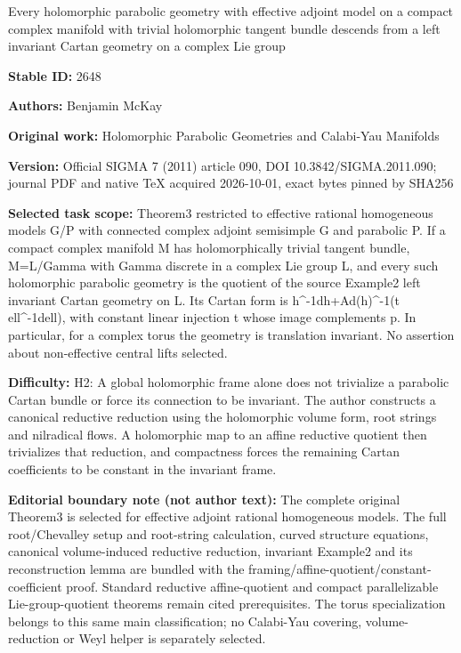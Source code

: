 \documentclass[11pt]{article}
\begin{document}
\begin{center}\Large Every holomorphic parabolic geometry with effective adjoint model on a compact complex manifold with trivial holomorphic tangent bundle descends from a left invariant Cartan geometry on a complex Lie group\end{center}
\noindent\textbf{Stable ID:} 2648\par
\noindent\textbf{Authors:} Benjamin McKay\par
\noindent\textbf{Original work:} Holomorphic Parabolic Geometries and Calabi-Yau Manifolds\par
\noindent\textbf{Version:} Official SIGMA 7 (2011) article 090, DOI 10.3842/SIGMA.2011.090; journal PDF and native TeX acquired 2026-10-01, exact bytes pinned by SHA256\par
\noindent\textbf{Selected task scope:} Theorem3 restricted to effective rational homogeneous models G/P with connected complex adjoint semisimple G and parabolic P. If a compact complex manifold M has holomorphically trivial tangent bundle, M=\allowbreak{}L/Gamma with Gamma discrete in a complex Lie group L, and every such holomorphic parabolic geometry is the quotient of the source Example2 left invariant Cartan geometry on L. Its Cartan form is h\textasciicircum{}-1dh+\allowbreak{}Ad(h)\textasciicircum{}-1(t ell\textasciicircum{}-1dell), with constant linear injection t whose image complements p. In particular, for a complex torus the geometry is translation invariant. No assertion about non-effective central lifts selected.\par
\noindent\textbf{Difficulty:} H2: A global holomorphic frame alone does not trivialize a parabolic Cartan bundle or force its connection to be invariant. The author constructs a canonical reductive reduction using the holomorphic volume form, root strings and nilradical flows. A holomorphic map to an affine reductive quotient then trivializes that reduction, and compactness forces the remaining Cartan coefficients to be constant in the invariant frame.\par
\noindent\textbf{Editorial boundary note (not author text):} The complete original Theorem3 is selected for effective adjoint rational homogeneous models. The full root/Chevalley setup and root-string calculation, curved structure equations, canonical volume-induced reductive reduction, invariant Example2 and its reconstruction lemma are bundled with the framing/affine-quotient/constant-coefficient proof. Standard reductive affine-quotient and compact parallelizable Lie-group-quotient theorems remain cited prerequisites. The torus specialization belongs to this same main classification; no Calabi-Yau covering, volume-reduction or Weyl helper is separately selected.\par
\end{document}
